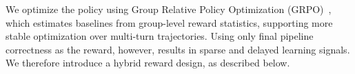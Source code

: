 We optimize the policy using Group Relative Policy Optimization (GRPO)~\cite{shao2024deepseekmath}, which estimates baselines from group-level reward statistics, supporting more stable optimization over multi-turn trajectories. Using only final pipeline correctness as the reward, however, results in sparse and delayed learning signals. We therefore introduce a hybrid reward design, as described below.


%
%



